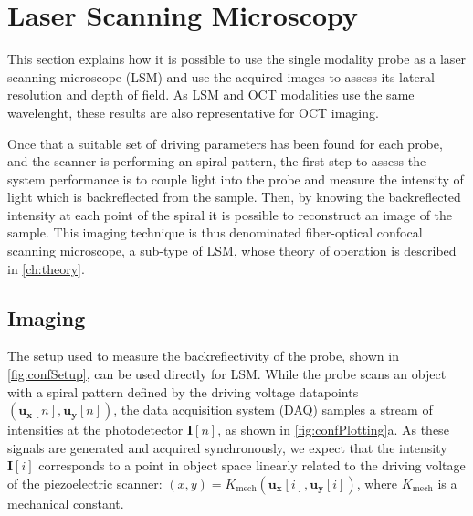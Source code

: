 \section{Laser Scanning Microscopy}
This section explains how it is possible to use the single modality probe as a laser scanning microscope (LSM) and use the acquired images to assess its lateral resolution and depth of field. As LSM and OCT modalities use the same wavelenght, these results are also representative for OCT imaging.

Once that a suitable set of driving parameters has been found for each probe, and the scanner is performing an spiral pattern, the first step to assess the system performance is to couple light into the probe and measure the intensity of light which is backreflected from the sample. Then, by knowing the backreflected intensity at each point of the spiral it is possible to reconstruct an image of the sample. This imaging technique is thus denominated fiber-optical confocal scanning microscope, a sub-type of LSM, whose theory of operation is described in \autoref{ch:theory}.


\subsection{Imaging}
The setup used to measure the backreflectivity of the probe, shown in \autoref{fig:confSetup}, can be used directly for LSM. While the probe scans an object with a spiral pattern defined by the driving voltage datapoints $(\mathbf{u_x}[n], \mathbf{u_y}[n])$, the data acquisition system (DAQ) samples a stream of intensities at the photodetector $\mathbf{I}[n]$, as shown in \autoref{fig:confPlotting}a. As these signals are generated and acquired synchronously, we expect that the intensity $\mathbf{I}[i]$ corresponds to a point in object space linearly related to the driving voltage of the piezoelectric scanner: $(x, y) = K_\mathrm{mech}(\mathbf{u_x}[i], \mathbf{u_y}[i])$, where $K_\mathrm{mech}$ is a mechanical constant.

